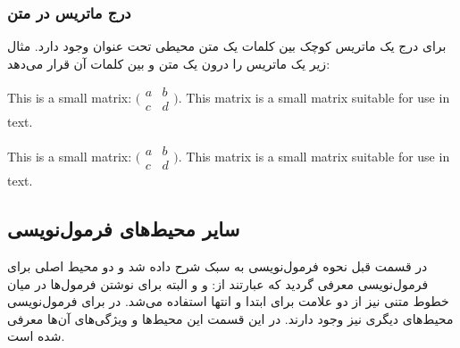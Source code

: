 \subsubsection{درج ماتریس در متن}
برای درج یک ماتریس کوچک بین کلمات یک متن محیطی تحت عنوان 
وجود دارد. مثال زیر یک ماتریس را درون یک متن و بین کلمات آن قرار
می‌دهد:
\begin{latex}
This is a small matrix: 
$\bigl(\begin{smallmatrix}
a&b\\ c&d
\end{smallmatrix} \bigr)$.
This matrix is a small matrix suitable for use in text.
\end{latex}
\begin{latin}
This is a small matrix: 
$\bigl(\begin{smallmatrix}
a&b\\ c&d
\end{smallmatrix} \bigr)$.
This matrix is a small matrix suitable for use in text.
\end{latin}


\subsection{سایر محیط‌های فرمول‌نویسی}
\label{sec:formula-environments}
در قسمت قبل نحوه فرمول‌نویسی به سبک \lr{\LaTeX} شرح داده شد و دو محیط اصلی برای
فرمول‌نویسی معرفی گردید که عبارتند از:  و  و البته
برای نوشتن فرمول‌ها در میان خطوط متنی نیز از دو علامت \lr{\textbackslash $\$$}
برای ابتدا و انتها استفاده می‌شد. در \lr{\LaTeX} برای فرمول‌نویسی محیط‌های دیگری
نیز وجود دارند. در این قسمت این محیط‌ها و ویژگی‌های آن‌ها معرفی شده است.

